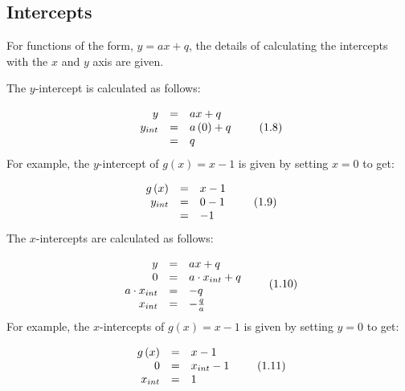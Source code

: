 \subsection*{ Intercepts}
\nopagebreak
\label{m39338*id238738}For functions of the form, $y=ax+q$, the details of calculating the intercepts with the $x$ and $y$ axis are given.\par 
\label{m39338*id238783}The $y$-intercept is calculated as follows:\par 
\label{m39338*uid85}\nopagebreak\noindent{}
\begin{equation}
\begin{array}{ccc}\hfill y& =& ax+q\hfill \\ \hfill {y}_{int}& =& a\left(0\right)+q\hfill \\ & =& q\hfill \end{array}\tag{1.8}
\end{equation}
\label{m39338*id238884}For example, the $y$-intercept of $g\left(x\right)=x-1$ is given by setting $x=0$ to get:\par 
\label{m39338*id238939}\nopagebreak\noindent{}
\begin{equation}
\begin{array}{ccc}\hfill g\left(x\right)& =& x-1\hfill \\ \hfill {y}_{int}& =& 0-1\hfill \\ & =& -1\hfill \end{array}\tag{1.9}
\end{equation}
\label{m39338*id239023}The $x$-intercepts are calculated as follows:\par 
\label{m39338*uid86}\nopagebreak\noindent{}
\begin{equation}
\begin{array}{ccc}\hfill y& =& ax+q\hfill \\ \hfill 0& =& a\ensuremath{\cdot}{x}_{int}+q\hfill \\ \hfill a\ensuremath{\cdot}{x}_{int}& =& -q\hfill \\ \hfill {x}_{int}& =& -\frac{q}{a}\hfill \end{array}\tag{1.10}
\end{equation}
\label{m39338*id239181}For example, the $x$-intercepts of $g\left(x\right)=x-1$ is given by setting $y=0$ to get:\par 
\label{m39338*id239235}\nopagebreak\noindent{}
\begin{equation}
\begin{array}{ccc}\hfill g\left(x\right)& =& x-1\hfill \\ \hfill 0& =& {x}_{int}-1\hfill \\ \hfill {x}_{int}& =& 1\hfill \end{array}\tag{1.11}
\end{equation}
\label{m39338*uid87}
